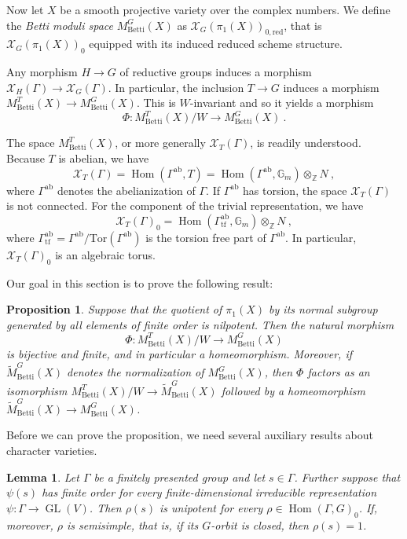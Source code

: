 \documentclass[11pt, a4paper]{amsart}
\newtheorem{lemma}[theorem]{Lemma}
\newtheorem{proposition}[theorem]{Proposition}
\theoremstyle{definition}
\theoremstyle{myitemstyle}
\newcommand{\Z}{\mathbb{Z}}
\newcommand{\G}{\mathbb{G}}
\newcommand{\red}{{\mathrm{red}}}
\newcommand{\mc}[1]{{\mathcal{#1}}}
\DeclareMathOperator{\Hom}{Hom}
\DeclareMathOperator{\GL}{GL}
\newcommand{\ab}{\mathrm{ab}}
\newcommand{\tf}{\mathrm{tf}}
\newcommand{\Betti}{{\mathrm{Betti}}}
\begin{document}
Now let $X$ be a smooth projective variety over the complex numbers.
We define the \emph{Betti moduli space} $M^G_\Betti(X)$ as $\mc X_G(\pi_1(X))_{0,\red}$, that is $\mc X_G(\pi_1(X))_0$ equipped with its induced reduced scheme structure.

Any morphism $H\to G$ of reductive groups induces a morphism $\mc X_H(\Gamma)\to \mc X_G(\Gamma)$. In particular, 
the inclusion $T\to G$ induces a morphism
\(
    M_\Betti^T(X)\to  M^G_\Betti(X)
\). This  is $W$-invariant and so it yields a  morphism
\[
 \Phi\colon    M^{T}_\Betti(X)/W \to M^G_\Betti(X)\ .
\]

The space $M_\Betti^T(X)$, or more generally $\mc X_T(\Gamma)$, is readily understood. Because $T$ is abelian, we have
\[
    \mc X_T(\Gamma)=\Hom(\Gamma^\ab,T)=\Hom(\Gamma^\ab,\G_m)\otimes_\Z N\ ,
\]
where $\Gamma^\ab$ denotes the abelianization of $\Gamma$. If $\Gamma^\ab$ has torsion, the space $\mc X_T(\Gamma)$ is not connected. For the component of the trivial representation, we have
\[
    \mc X_T(\Gamma)_0 = \Hom(\Gamma^\ab_\tf,\G_m)\otimes_\Z N \ ,
\]
where $\Gamma^\ab_\tf=\Gamma^\ab/\mathrm{Tor}(\Gamma^\ab)$ is the torsion free part of $\Gamma^\ab$.
In particular, $\mc X_T(\Gamma)_0$ is an algebraic torus.


Our goal in this section is to prove the following result:
\begin{proposition}
\label{prop:reduction to T Betti}
    Suppose that the quotient of $\pi_1(X)$ by its normal subgroup generated by all elements of finite order is nilpotent. Then the natural morphism 
    \[
    \Phi\colon M^{T}_\Betti(X)/W \to M^G_\Betti(X)
    \] 
    is bijective and finite, and in particular a homeomorphism. Moreover, if $\widetilde M^G_\Betti(X)$ denotes the normalization of $M^G_\Betti(X)$, then $\Phi$ factors as an isomorphism $M^T_\Betti(X)/W\to \widetilde M^G_\Betti(X)$ followed by a homeomorphism $\widetilde M^G_\Betti(X)\to M^G_\Betti(X)$.
\end{proposition}

Before we can prove the proposition, we need several auxiliary results about character varieties. 

\begin{lemma}
\label{lem:unipotent on identity component}
Let $\Gamma$ be a finitely presented group and let $s\in \Gamma$. Further suppose that $\psi(s)$ has finite order for every finite-dimensional irreducible representation $\psi\colon \Gamma\to \GL(V)$. 
Then $\rho(s)$ is unipotent for every $\rho\in \Hom(\Gamma,G)_0$. If, moreover, $\rho$ is semisimple, that is, if its $G$-orbit is closed, then $\rho(s)=1$. 
\end{lemma}
\end{document}

